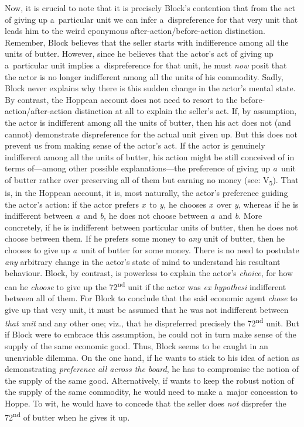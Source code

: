 Now, it is crucial to note that it is precisely Block's contention that from the act of giving up a~particular unit we can infer a~dispreference for that very unit that leads him to the weird eponymous after-action/before-action distinction. Remember, Block believes that the seller starts with indifference among all the units of butter. However, since he believes that the actor's act of giving up a~particular unit implies a~dispreference for that unit, he must \textit{now} posit that the actor is no longer indifferent among all the units of his commodity. Sadly, Block never explains why there is this sudden change in the actor's mental state. By contrast, the Hoppean account does not need to resort to the before-action/after-action distinction at all to explain the seller's act. If, by assumption, the actor is indifferent among all the units of butter, then his act does not (and cannot) demonstrate dispreference for the actual unit given up. But this does not prevent us from making sense of the actor's act. If the actor is genuinely indifferent among all the units of butter, his action might be still conceived of in terms of---among other possible explanations---the preference of giving up \textit{a}~unit of butter rather over preserving all of them but earning no money (see: V\textsubscript{5}). That is, in the Hoppean account, it is, most naturally, the actor's preference guiding the actor's action: if the actor prefers \textit{x}~to \textit{y,} he chooses \textit{x}~over \textit{y}, whereas if he is indifferent between \textit{a}~and \textit{b,} he does not choose between \textit{a}~and \textit{b}. More concretely, if he is indifferent between particular units of butter, then he does not choose between them. If he prefers some money to \textit{any} unit of butter, then he chooses to give up \textit{a}~unit of butter for some money. There is no need to postulate \textit{any} arbitrary change in the actor's state of mind to understand his resultant behaviour. Block, by contrast, is powerless to explain the actor's \textit{choice}, for how can he \textit{choose} to give up the 72\textsuperscript{nd} unit if the actor was \textit{ex hypothesi} indifferent between all of them. For Block to conclude that the said economic agent \textit{chose} to give up that very unit, it must be assumed that he was not indifferent between \textit{that unit} and any other one; viz., that he dispreferred precisely the 72\textsuperscript{nd }unit. But if Block were to embrace this assumption, he could not in turn make sense of the supply of the same economic good. Thus, Block seems to be caught in an unenviable dilemma. On the one hand, if he wants to stick to his idea of action as demonstrating \textit{preference all across the board}, he has to compromise the notion of the supply of the same good. Alternatively, if wants to keep the robust notion of the supply of the same commodity, he would need to make a~major concession to Hoppe. To wit, he would have to concede that the seller does \textit{not} disprefer the 72\textsuperscript{nd} of butter when he gives it up.



